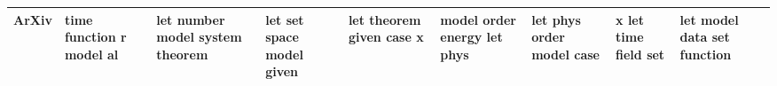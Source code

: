 \documentclass[11pt,a4paper]{article}
\begin{document}
\begin{appendices}
\begin{table*}[htb]
\begin{tiny}
\begin{tabular}{|p{}|p{}|p{}|p{}|p{}|p{}|p{}|p{}|p{}|}
    ArXiv & time \newline function \newline r \newline model \newline al & let \newline number \newline model \newline system \newline theorem & let \newline set \newline space \newline model \newline given & let \newline theorem \newline given \newline case \newline x & model \newline order \newline energy \newline let \newline phys & let \newline phys \newline order \newline model \newline case & x \newline let \newline time \newline field \newline set & let \newline model \newline data \newline set \newline function\\\hline

\end{tabular}
\end{tiny}
\end{table*}
\end{appendices}
\end{document}
